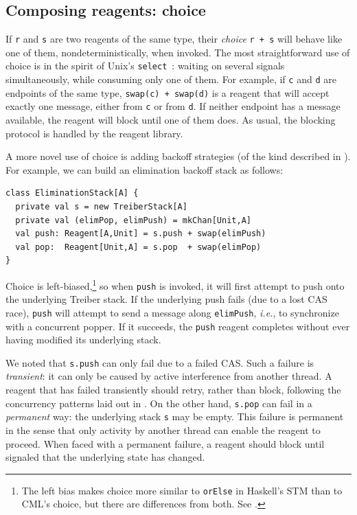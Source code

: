 \documentclass[preprint,nocopyrightspace]{sigplanconf}
\begin{document}

\subsection{Composing reagents: choice}
\label{sec:choice}

If \lstinline{r} and \lstinline{s} are two reagents of the same type,
their \emph{choice} \lstinline{r + s} will behave like one of them,
nondeterministically, when invoked.  The most straightforward use of
choice is in the spirit of Unix's \lstinline{select}~\cite{?}: waiting
on several signals simultaneously, while consuming only one of them.
For example, if \lstinline{c} and \lstinline{d} are endpoints of the
same type, \lstinline{swap(c) + swap(d)} is a reagent that will accept
exactly one message, either from \lstinline{c} or from \lstinline{d}.
If neither endpoint has a message available, the reagent will block
until one of them does.  As usual, the blocking protocol is handled by
the reagent library.

A more novel use of choice is adding backoff strategies (of the kind
described in ).  For example, we can build an elimination
backoff stack as follows:
\begin{lstlisting}
class EliminationStack[A] {
  private val s = new TreiberStack[A]
  private val (elimPop, elimPush) = mkChan[Unit,A]
  val push: Reagent[A,Unit] = s.push + swap(elimPush)
  val pop:  Reagent[Unit,A] = s.pop  + swap(elimPop)
}
\end{lstlisting}
Choice is left-biased,\footnote{The left bias makes choice more
  similar to \lstinline{orElse} in Haskell's STM than to CML's choice,
  but there are differences from both.  See .  } so
when \lstinline{push} is invoked, it will first attempt to push onto
the underlying Treiber stack.  If the underlying push fails (due to a
lost CAS race), \lstinline{push} will attempt to send a message along
\lstinline{elimPush}, \emph{i.e.}, to synchronize with a concurrent
popper.  If it succeeds, the \lstinline{push} reagent completes
without ever having modified its underlying stack.

We noted that \lstinline{s.push} can only fail due to a failed CAS.
Such a failure is \emph{transient}: it can only be caused by active
interference from another thread.  A reagent that has failed
transiently should retry, rather than block, following the concurrency
patterns laid out in .  On the other hand,
\lstinline{s.pop} can fail in a \emph{permanent} way: the underlying
stack \lstinline{s} may be empty.  This failure is permanent in the
sense that only activity by another thread can enable the reagent to
proceed.  When faced with a permanent failure, a reagent should block
until signaled that the underlying state has changed.
\end{document}
